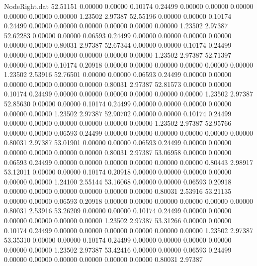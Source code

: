 \begin{filecontents}{NodeRight.dat}
  52.51151    0.00000    0.00000     0.10174    0.24499    0.00000    0.00000    0.00000    0.00000    0.00000    0.00000    1.23502    2.97387
  52.55196    0.00000    0.00000     0.10174    0.24499    0.00000    0.00000    0.00000    0.00000    0.00000    0.00000    1.23502    2.97387
  52.62283    0.00000    0.00000     0.06593    0.24499    0.00000    0.00000    0.00000    0.00000    0.00000    0.00000    0.80031    2.97387
  52.67344    0.00000    0.00000     0.10174    0.24499    0.00000    0.00000    0.00000    0.00000    0.00000    0.00000    1.23502    2.97387
  52.71397    0.00000    0.00000     0.10174    0.20918    0.00000    0.00000    0.00000    0.00000    0.00000    0.00000    1.23502    2.53916
  52.76501    0.00000    0.00000     0.06593    0.24499    0.00000    0.00000    0.00000    0.00000    0.00000    0.00000    0.80031    2.97387
  52.81573    0.00000    0.00000     0.10174    0.24499    0.00000    0.00000    0.00000    0.00000    0.00000    0.00000    1.23502    2.97387
  52.85630    0.00000    0.00000     0.10174    0.24499    0.00000    0.00000    0.00000    0.00000    0.00000    0.00000    1.23502    2.97387
  52.90702    0.00000    0.00000     0.10174    0.24499    0.00000    0.00000    0.00000    0.00000    0.00000    0.00000    1.23502    2.97387
  52.95766    0.00000    0.00000     0.06593    0.24499    0.00000    0.00000    0.00000    0.00000    0.00000    0.00000    0.80031    2.97387
  53.01901    0.00000    0.00000     0.06593    0.24499    0.00000    0.00000    0.00000    0.00000    0.00000    0.00000    0.80031    2.97387
  53.06958    0.00000    0.00000     0.06593    0.24499    0.00000    0.00000    0.00000    0.00000    0.00000    0.00000    0.80443    2.98917
  53.12011    0.00000    0.00000     0.10174    0.20918    0.00000    0.00000    0.00000    0.00000    0.00000    0.00000    1.24100    2.55144
  53.16068    0.00000    0.00000     0.06593    0.20918    0.00000    0.00000    0.00000    0.00000    0.00000    0.00000    0.80031    2.53916
  53.21135    0.00000    0.00000     0.06593    0.20918    0.00000    0.00000    0.00000    0.00000    0.00000    0.00000    0.80031    2.53916
  53.26209    0.00000    0.00000     0.10174    0.24499    0.00000    0.00000    0.00000    0.00000    0.00000    0.00000    1.23502    2.97387
  53.31266    0.00000    0.00000     0.10174    0.24499    0.00000    0.00000    0.00000    0.00000    0.00000    0.00000    1.23502    2.97387
  53.35310    0.00000    0.00000     0.10174    0.24499    0.00000    0.00000    0.00000    0.00000    0.00000    0.00000    1.23502    2.97387
  53.42416    0.00000    0.00000     0.06593    0.24499    0.00000    0.00000    0.00000    0.00000    0.00000    0.00000    0.80031    2.97387

\end{filecontents}
